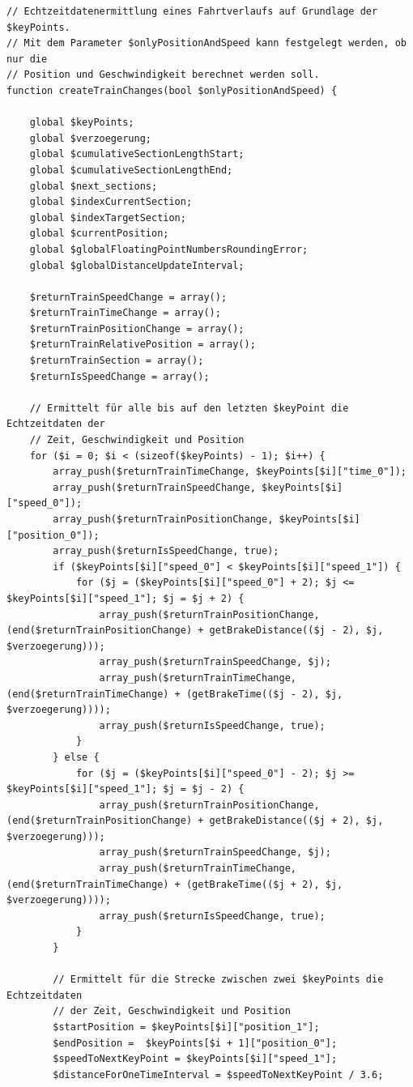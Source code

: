 \vspace{20pt}
\begin{lstlisting}[caption={\textit{createTrainChanges$($$)$} (\textit{functions\_fahrtverlauf.php})},captionpos=b,label={lst:createTrainChanges}]
// Echtzeitdatenermittlung eines Fahrtverlaufs auf Grundlage der $keyPoints.
// Mit dem Parameter $onlyPositionAndSpeed kann festgelegt werden, ob nur die
// Position und Geschwindigkeit berechnet werden soll.
function createTrainChanges(bool $onlyPositionAndSpeed) {

	global $keyPoints;
	global $verzoegerung;
	global $cumulativeSectionLengthStart;
	global $cumulativeSectionLengthEnd;
	global $next_sections;
	global $indexCurrentSection;
	global $indexTargetSection;
	global $currentPosition;
	global $globalFloatingPointNumbersRoundingError;
	global $globalDistanceUpdateInterval;

	$returnTrainSpeedChange = array();
	$returnTrainTimeChange = array();
	$returnTrainPositionChange = array();
	$returnTrainRelativePosition = array();
	$returnTrainSection = array();
	$returnIsSpeedChange = array();

	// Ermittelt für alle bis auf den letzten $keyPoint die Echtzeitdaten der
	// Zeit, Geschwindigkeit und Position
	for ($i = 0; $i < (sizeof($keyPoints) - 1); $i++) {
		array_push($returnTrainTimeChange, $keyPoints[$i]["time_0"]);
		array_push($returnTrainSpeedChange, $keyPoints[$i]["speed_0"]);
		array_push($returnTrainPositionChange, $keyPoints[$i]["position_0"]);
		array_push($returnIsSpeedChange, true);
		if ($keyPoints[$i]["speed_0"] < $keyPoints[$i]["speed_1"]) {
			for ($j = ($keyPoints[$i]["speed_0"] + 2); $j <= $keyPoints[$i]["speed_1"]; $j = $j + 2) {
				array_push($returnTrainPositionChange, (end($returnTrainPositionChange) + getBrakeDistance(($j - 2), $j, $verzoegerung)));
				array_push($returnTrainSpeedChange, $j);
				array_push($returnTrainTimeChange, (end($returnTrainTimeChange) + (getBrakeTime(($j - 2), $j, $verzoegerung))));
				array_push($returnIsSpeedChange, true);
			}
		} else {
			for ($j = ($keyPoints[$i]["speed_0"] - 2); $j >= $keyPoints[$i]["speed_1"]; $j = $j - 2) {
				array_push($returnTrainPositionChange, (end($returnTrainPositionChange) + getBrakeDistance(($j + 2), $j, $verzoegerung)));
				array_push($returnTrainSpeedChange, $j);
				array_push($returnTrainTimeChange, (end($returnTrainTimeChange) + (getBrakeTime(($j + 2), $j, $verzoegerung))));
				array_push($returnIsSpeedChange, true);
			}
		}

		// Ermittelt für die Strecke zwischen zwei $keyPoints die Echtzeitdaten
		// der Zeit, Geschwindigkeit und Position
		$startPosition = $keyPoints[$i]["position_1"];
		$endPosition =  $keyPoints[$i + 1]["position_0"];
		$speedToNextKeyPoint = $keyPoints[$i]["speed_1"];
		$distanceForOneTimeInterval = $speedToNextKeyPoint / 3.6;


\end{lstlisting}
